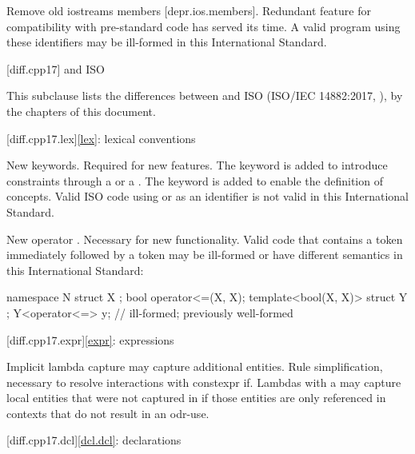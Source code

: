 \nodiffref
\change
Remove old iostreams members [depr.ios.members].
\rationale Redundant feature for compatibility with pre-standard code
has served its time.
\effect A valid \CppXIV{} program using these identifiers
may be ill-formed in this International Standard.

[diff.cpp17]{\Cpp{} and ISO \CppXVII{}}

\pnum
{}%
This subclause lists the differences between \Cpp{} and
ISO \CppXVII{} (ISO/IEC 14882:2017, ),
by the chapters of this document.

[diff.cpp17.lex]{\ref{lex}: lexical conventions}

\change New keywords.
\rationale Required for new features.
The  keyword is added
to introduce constraints through a  or
a . The  keyword is
added to enable the definition of concepts.
\effect
Valid ISO \CppXVII{} code using  or 
as an identifier is not valid in this International Standard.

\change New operator \tcode{<=>}.
\rationale Necessary for new functionality.
\effect Valid \CppXVII{} code that contains a \tcode{<=} token
immediately followed by a \tcode{>} token
may be ill-formed or have different semantics in this International Standard:
\begin{codeblock}
namespace N {
  struct X {};
  bool operator<=(X, X);
  template<bool(X, X)> struct Y {};
  Y<operator<=> y;              // ill-formed; previously well-formed
}
\end{codeblock}

[diff.cpp17.expr]{\ref{expr}: expressions}

\change Implicit lambda capture may capture additional entities.
\rationale Rule simplification, necessary to resolve interactions with constexpr if.
\effect Lambdas with a 
may capture local entities
that were not captured in \CppXVII{}
if those entities are only referenced in contexts
that do not result in an odr-use.

[diff.cpp17.dcl]{\ref{dcl.dcl}: declarations}

